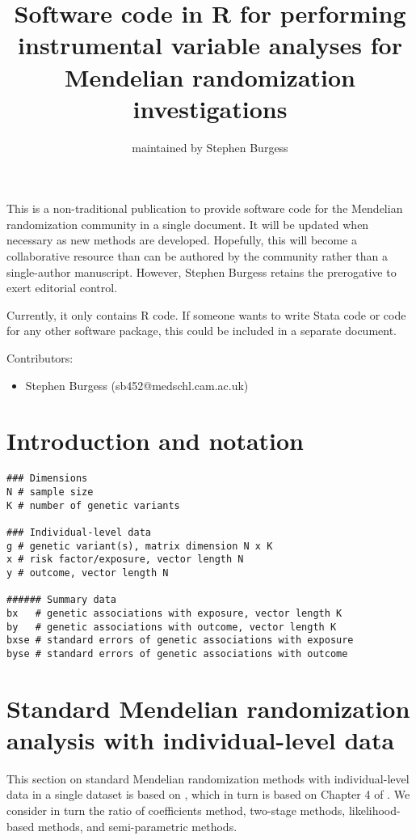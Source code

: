 \documentclass[a4paper,12pt]{article} %
\begin{document}
\title{Software code in R for performing instrumental variable analyses for Mendelian randomization investigations}
\author{maintained by Stephen Burgess}
\maketitle
This is a non-traditional publication to provide software code for the Mendelian randomization community in a single document. It will be updated when necessary as new methods are developed. Hopefully, this will become a collaborative resource than can be authored by the community rather than a single-author manuscript. However, Stephen Burgess retains the prerogative to exert editorial control.

Currently, it only contains R code. If someone wants to write Stata code or code for any other software package, this could be included in a separate document.

Contributors: 
\begin{itemize}
\item Stephen Burgess (sb452@medschl.cam.ac.uk)
\end{itemize}

\clearpage

\tableofcontents %

\clearpage

\section{Introduction and notation}
\begin{lstlisting}
### Dimensions
N # sample size
K # number of genetic variants

### Individual-level data
g # genetic variant(s), matrix dimension N x K
x # risk factor/exposure, vector length N
y # outcome, vector length N

###### Summary data
bx   # genetic associations with exposure, vector length K
by   # genetic associations with outcome, vector length K
bxse # standard errors of genetic associations with exposure
byse # standard errors of genetic associations with outcome
\end{lstlisting}

\clearpage

\section{Standard Mendelian randomization analysis with individual-level data}
This section on standard Mendelian randomization methods with individual-level data in a single dataset is based on \cite{burgess2015review}, which in turn is based on Chapter 4 of \cite{burgess2015book}. We consider in turn the ratio of coefficients method, two-stage methods, likelihood-based methods, and semi-parametric methods.
\end{document}
